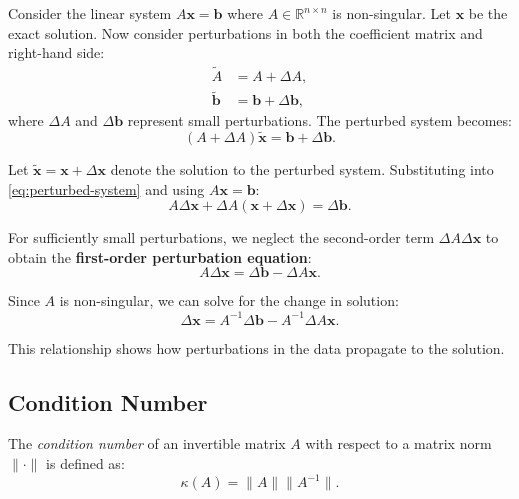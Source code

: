 Consider the linear system $A\mathbf{x} = \mathbf{b}$ where $A \in \mathbb{R}^{n \times n}$ is non-singular. Let $\mathbf{x}$ be the exact solution. Now consider perturbations in both the coefficient matrix and right-hand side:
\begin{align}
    \tilde{A}          & = A + \Delta A,                   \\
    \tilde{\mathbf{b}} & = \mathbf{b} + \Delta \mathbf{b},
\end{align}
where $\Delta A$ and $\Delta \mathbf{b}$ represent small perturbations. The perturbed system becomes:
\begin{equation}
    (A + \Delta A)\tilde{\mathbf{x}} = \mathbf{b} + \Delta \mathbf{b}.
    \label{eq:perturbed-system}
\end{equation}

Let $\tilde{\mathbf{x}} = \mathbf{x} + \Delta \mathbf{x}$ denote the solution to the perturbed system. Substituting into \eqref{eq:perturbed-system} and using $A\mathbf{x} = \mathbf{b}$:
\begin{equation}
    A\Delta \mathbf{x} + \Delta A(\mathbf{x} + \Delta \mathbf{x}) = \Delta \mathbf{b}.
\end{equation}

For sufficiently small perturbations, we neglect the second-order term $\Delta A \Delta \mathbf{x}$ to obtain the \textbf{first-order perturbation equation}:
\begin{equation}
    A\Delta \mathbf{x} = \Delta \mathbf{b} - \Delta A \mathbf{x}.
    \label{eq:first-order-perturbation}
\end{equation}

Since $A$ is non-singular, we can solve for the change in solution:
\begin{equation}
    \Delta \mathbf{x} = A^{-1}\Delta \mathbf{b} - A^{-1}\Delta A \mathbf{x}.
    \label{eq:solution-perturbation}
\end{equation}

This relationship shows how perturbations in the data propagate to the solution.

\subsection{Condition Number}

The \emph{condition number} of an invertible matrix $A$ with respect to a matrix norm $\|\cdot\|$ is defined as:
\begin{equation}
    \kappa(A) = \|A\| \|A^{-1}\|.
    \label{eq:condition-number}
\end{equation}

